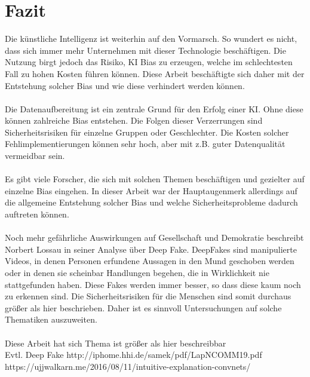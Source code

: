 \documentclass[12pt,oneside,a4paper,parskip]{scrbook}
\begin{document}
\chapter{Fazit}
Die künstliche Intelligenz ist weiterhin auf den Vormarsch. So wundert es nicht, dass sich immer mehr Unternehmen mit dieser Technologie beschäftigen. Die Nutzung birgt jedoch das Risiko, KI Bias zu erzeugen, welche im schlechtesten Fall zu hohen Kosten führen können. Diese Arbeit beschäftigte sich daher mit der Entstehung solcher Bias und wie diese verhindert werden können.
\\\\
Die Datenaufbereitung ist ein zentrale Grund für den Erfolg einer KI. Ohne diese können zahlreiche Bias entstehen. Die Folgen dieser Verzerrungen sind Sicherheitsrisiken für einzelne Gruppen oder Geschlechter. Die Kosten solcher Fehlimplementierungen können sehr hoch, aber mit z.B. guter Datenqualität vermeidbar sein.
\\\\
Es gibt viele Forscher, die sich mit solchen Themen beschäftigen und gezielter auf einzelne Bias eingehen. In dieser Arbeit war der Hauptaugenmerk allerdings auf die allgemeine Entstehung solcher Bias und welche Sicherheitsprobleme dadurch auftreten können.
\\\\
Noch mehr gefährliche Auswirkungen auf Gesellschaft und Demokratie beschreibt Norbert Lossau in seiner Analyse über Deep Fake\cite{deepFake}. DeepFakes sind manipulierte Videos, in denen Personen erfundene Aussagen in den Mund geschoben werden oder in denen sie scheinbar Handlungen begehen, die in Wirklichkeit nie stattgefunden haben. Diese Fakes werden immer besser, so dass diese kaum noch zu erkennen sind. Die Sicherheitsrisiken für die Menschen sind somit durchaus größer als hier beschrieben. Daher ist es sinnvoll Untersuchungen auf solche Thematiken auszuweiten.
\\\\
Diese Arbeit hat sich
Thema ist größer als hier beschreibbar
\\Evtl. Deep Fake
http://iphome.hhi.de/samek/pdf/LapNCOMM19.pdf
https://ujjwalkarn.me/2016/08/11/intuitive-explanation-convnets/


\backmatter


\cleardoublepage
{}
{}
\printbibliography
\end{document}
